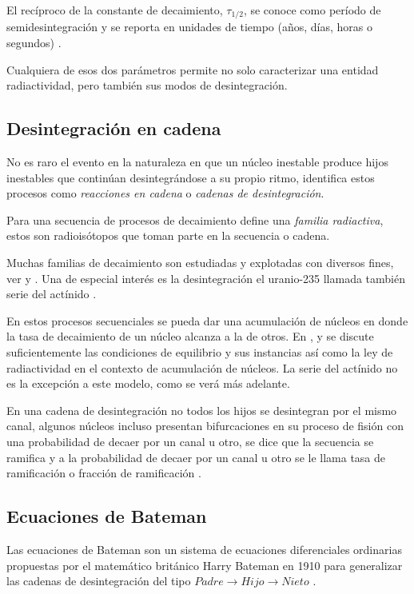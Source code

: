 El recíproco de la constante de decaimiento, $\tau_{1/2}$, se conoce como período de semidesintegración y se reporta en unidades de tiempo (años, días, horas o segundos) \cite{Podgorsak.2016}. 

Cualquiera de esos dos parámetros permite no solo caracterizar una entidad radiactividad, pero también sus modos de desintegración. 

\subsection{Desintegración en cadena}
No es raro el evento en la naturaleza en que un núcleo inestable produce hijos inestables que continúan desintegrándose a su propio ritmo, \cite{Podgorsak.2016} identifica estos procesos como \textit{reacciones en cadena} o \textit{cadenas de desintegración}. 

Para \cite{Sanctis.2016} una secuencia de procesos de decaimiento define una \textit{familia radiactiva}, estos son radioisótopos que toman parte en la secuencia o cadena. 

Muchas familias de decaimiento son estudiadas y explotadas con diversos fines, ver \cite{Eidemuller.2021} y \cite{Koizumi.2021}. Una de especial interés es la desintegración el uranio-235 llamada también serie del actínido \cite{Krane.1987}.

En estos procesos secuenciales se pueda dar una acumulación de núcleos en donde la tasa de decaimiento de un núcleo alcanza a la de otros. En \cite{Sanctis.2016}, \cite{Podgorsak.2016} y \cite{Krane.1987} se discute suficientemente las condiciones de equilibrio y sus instancias así como la ley de radiactividad en el contexto de acumulación de núcleos. La serie del actínido no es la excepción a este modelo, como se verá más adelante.  

En una cadena de desintegración no todos los hijos se desintegran por el mismo canal, algunos núcleos incluso presentan bifurcaciones en su proceso de fisión con una probabilidad de decaer por un canal u otro, se dice que la secuencia se ramifica\cite{HUBENER2003211, Cottingham.2001, Podgorsak.2016} y a la probabilidad de decaer por un canal u otro se le llama tasa de ramificación \cite{Sanctis.2016} o fracción de ramificación \cite{Podgorsak.2016}.

\subsection{Ecuaciones de Bateman}
\noindent Las ecuaciones de Bateman son un sistema de ecuaciones diferenciales ordinarias propuestas por el matemático británico Harry Bateman en 1910 para generalizar las cadenas de desintegración del tipo $Padre\rightarrow Hijo \rightarrow Nieto$ \cite{Podgorsak.2016}.

